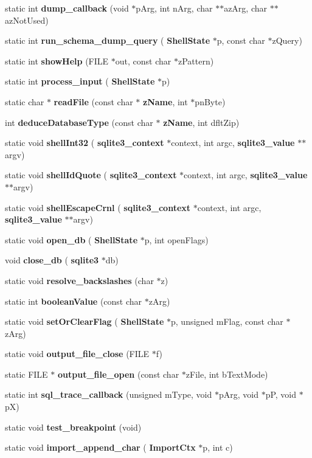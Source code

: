 \begin{DoxyCompactItemize}
static int \textbf{ dump\+\_\+callback} (void $\ast$p\+Arg, int n\+Arg, char $\ast$$\ast$az\+Arg, char $\ast$$\ast$az\+Not\+Used)
\item 
static int \textbf{ run\+\_\+schema\+\_\+dump\+\_\+query} (\textbf{ Shell\+State} $\ast$p, const char $\ast$z\+Query)
\item 
static int \textbf{ show\+Help} (F\+I\+LE $\ast$out, const char $\ast$z\+Pattern)
\item 
static int \textbf{ process\+\_\+input} (\textbf{ Shell\+State} $\ast$p)
\item 
static char $\ast$ \textbf{ read\+File} (const char $\ast$\textbf{ z\+Name}, int $\ast$pn\+Byte)
\item 
int \textbf{ deduce\+Database\+Type} (const char $\ast$\textbf{ z\+Name}, int dflt\+Zip)
\item 
static void \textbf{ shell\+Int32} (\textbf{ sqlite3\+\_\+context} $\ast$context, int argc, \textbf{ sqlite3\+\_\+value} $\ast$$\ast$argv)
\item 
static void \textbf{ shell\+Id\+Quote} (\textbf{ sqlite3\+\_\+context} $\ast$context, int argc, \textbf{ sqlite3\+\_\+value} $\ast$$\ast$argv)
\item 
static void \textbf{ shell\+Escape\+Crnl} (\textbf{ sqlite3\+\_\+context} $\ast$context, int argc, \textbf{ sqlite3\+\_\+value} $\ast$$\ast$argv)
\item 
static void \textbf{ open\+\_\+db} (\textbf{ Shell\+State} $\ast$p, int open\+Flags)
\item 
void \textbf{ close\+\_\+db} (\textbf{ sqlite3} $\ast$db)
\item 
static void \textbf{ resolve\+\_\+backslashes} (char $\ast$z)
\item 
static int \textbf{ boolean\+Value} (const char $\ast$z\+Arg)
\item 
static void \textbf{ set\+Or\+Clear\+Flag} (\textbf{ Shell\+State} $\ast$p, unsigned m\+Flag, const char $\ast$z\+Arg)
\item 
static void \textbf{ output\+\_\+file\+\_\+close} (F\+I\+LE $\ast$f)
\item 
static F\+I\+LE $\ast$ \textbf{ output\+\_\+file\+\_\+open} (const char $\ast$z\+File, int b\+Text\+Mode)
\item 
static int \textbf{ sql\+\_\+trace\+\_\+callback} (unsigned m\+Type, void $\ast$p\+Arg, void $\ast$pP, void $\ast$pX)
\item 
static void \textbf{ test\+\_\+breakpoint} (void)
\item 
static void \textbf{ import\+\_\+append\+\_\+char} (\textbf{ Import\+Ctx} $\ast$p, int c)
$$
\end{DoxyCompactItemize}
